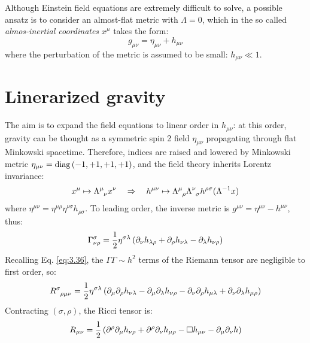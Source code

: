 
Although Einstein field equations are extremely difficult to solve, a possible ansatz is to consider an almost-flat metric with $ \Lambda = 0 $, which in the so called \textit{almos-inertial coordinates} $ x^\mu $ takes the form:
\begin{equation}
  g_{\mu \nu} = \eta_{\mu \nu} + h_{\mu \nu}
  \label{eq:5.1}
\end{equation}
where the perturbation of the metric is assumed to be small: $ h_{\mu \nu} \ll 1 $.

\section{Linerarized gravity}

The aim is to expand the field equations to linear order in $ h_{\mu \nu} $: at this order, gravity can be thought as a symmetric spin 2 field $ \eta_{\mu \nu} $ propagating through flat Minkowski spacetime. Therefore, indices are raised and lowered by Minkowski metric $ \eta_{\mu \nu} = \operatorname{diag} \left( -1,+1,+1,+1 \right) $, and the field theory inherits Lorentz invariance:
\begin{equation*}
  x^\mu \mapsto \tensor{\Lambda}{^\mu_\nu} x^\nu
  \quad \Rightarrow \quad
  h^{\mu \nu} \mapsto \tensor{\Lambda}{^\mu_\rho} \tensor{\Lambda}{^\nu_\sigma} h^{\rho \sigma} (\Lambda^{-1} x)
\end{equation*}
where $ \eta^{\mu \nu} = \eta^{\mu \rho} \eta^{\nu \sigma} h_{\rho \sigma} $. To leading order, the inverse metric is $ g^{\mu \nu} = \eta^{\mu \nu} - h^{\mu \nu} $, thus:
\begin{equation}
  \Gamma^\sigma_{\nu \rho} = \frac{1}{2} \eta^{\sigma \lambda} \left( \partial_\nu h_{\lambda \rho} + \partial_\rho h_{\nu \lambda} - \partial_\lambda h_{\nu \rho} \right)
  \label{eq:5.2}
\end{equation}
Recalling Eq. \ref{eq:3.36}, the $ \Gamma \Gamma \sim h^2 $ terms of the Riemann tensor are negligible to first order, so:
\begin{equation}
  \tensor{R}{^\sigma_{\rho \mu \nu}} = \frac{1}{2} \eta^{\sigma \lambda} \left( \pa_\mu \pa_\rho h_{\nu \lambda} - \pa_\mu \pa_\lambda h_{\nu \rho} - \pa_\nu \pa_\rho h_{\mu \lambda} + \pa_\nu \pa_\lambda h_{\mu \rho} \right)
  \label{eq:5.3}
\end{equation}
Contracting $ (\sigma,\rho) $, the Ricci tensor is:
\begin{equation}
  R_{\mu \nu} = \frac{1}{2} \left( \partial^\rho \partial_\mu h_{\nu \rho} + \partial^\rho \partial_\nu h_{\mu \rho} - \Box h_{\mu \nu} - \partial_\mu \partial_\nu h \right)
  \label{eq:5.4}
\end{equation}
